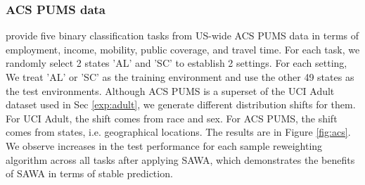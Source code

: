 \subsubsection{ACS PUMS data} \citet{ding2021retiring} provide five binary classification tasks from US-wide ACS PUMS data in terms of employment, income, mobility, public coverage, and travel time. For each task, we randomly select 2 states 'AL' and 'SC' to establish 2 settings. For each setting, We treat 'AL' or 'SC' as the training environment and use the other 49 states as the test environments. Although ACS PUMS is a superset of the UCI Adult dataset used in Sec \ref{exp:adult}, we generate different distribution shifts for them. For UCI Adult, the shift comes from race and sex. For ACS PUMS, the shift comes from states, i.e. geographical locations. 
The results are in Figure \ref{fig:acs}. We observe increases in the test performance for each sample reweighting algorithm across all tasks after applying SAWA, which demonstrates the benefits of SAWA in terms of stable prediction. 
